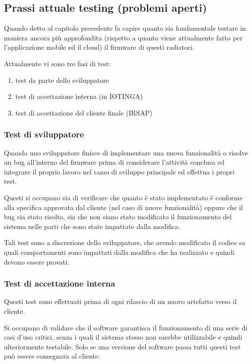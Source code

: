 \documentclass{article}
\begin{document}
\subsection{Prassi attuale testing (problemi aperti)}

Quando detto al capitolo precedente fa capire quanto sia fondamentale testare in maniera
ancora più approfondita (rispetto a quanto viene attualmente fatto per l'applicazione
mobile ed il cloud) il firmware di questi radiatori.

Attualmente vi sono tre fasi di test:
\begin{enumerate}
    \item test da parte dello sviluppatore
    \item test di accettazione interna (in IOTINGA)
    \item test di accettazione del cliente finale (IRSAP)
\end{enumerate}

\subsubsection{Test di sviluppatore}

Quando uno sviluppatore finisce di implementare una nuova funzionalità o risolve un
bug all'interno del firmware prima di considerare l'attività conclusa ed integrare il
proprio lavoro nel ramo di sviluppo principale ed effettua i propri test.

Questi si occupano sia di verificare che quanto è stato implementato è conforme
alla specifica approvata dal cliente (nel caso di nuove funzionalità) oppure che
il bug sia stato risolto, sia che non siano stato modificato il funzionamento del sistema
nelle parti che sono state impattate dalla modifica.

Tali test sono a discrezione dello sviluppatore, che avendo modificato il codice sa
quali comportamenti sono impattati dalla modifica che ha realizzato e quindi devono essere
provati.

\subsubsection{Test di accettazione interna}

Questi test sono effettuati prima di ogni rilascio di un nuovo artefatto verso il cliente.

Si occupano di validare che il software garantisca il funzionamento di una serie di casi d'uso critici,
senza i quali il sistema stesso non sarebbe utilizzabile e quindi ulteriormente testabile.
Solo se una versione del software passa tutti questi test può essere consegnata al cliente.
\end{document}
